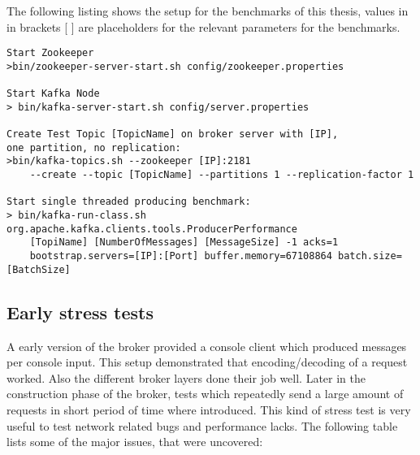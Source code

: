 The following listing shows the setup for the benchmarks of this thesis,
values in in brackets [ ] are placeholders for the relevant parameters for the benchmarks.
\begin{verbatim}
Start Zookeeper
>bin/zookeeper-server-start.sh config/zookeeper.properties

Start Kafka Node 
> bin/kafka-server-start.sh config/server.properties

Create Test Topic [TopicName] on broker server with [IP], 
one partition, no replication: 
>bin/kafka-topics.sh --zookeeper [IP]:2181 
    --create --topic [TopicName] --partitions 1 --replication-factor 1

Start single threaded producing benchmark: 
> bin/kafka-run-class.sh org.apache.kafka.clients.tools.ProducerPerformance 
    [TopiName] [NumberOfMessages] [MessageSize] -1 acks=1 
    bootstrap.servers=[IP]:[Port] buffer.memory=67108864 batch.size=[BatchSize]
\end{verbatim}




\newpage
\subsection{Early stress tests}
A early version of the broker provided a console client which produced 
messages per console input. This setup demonstrated that encoding/decoding of a
request worked. Also the different broker layers done their job well.
Later in the construction phase of the broker, tests which repeatedly send
a large amount of requests in short period of time where introduced. This kind
of stress test is very useful to test network related bugs and performance
lacks. The following table lists some of the major issues, that were uncovered: 

